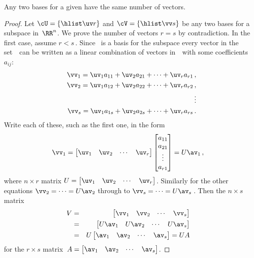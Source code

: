 \begin{theorem} \label{thm:sameDii} 
Any two bases for a given  have the same number of vectors.
\end{theorem}
\begin{proof} 
Let \(\cU=\{\hlist\uv r\}\) and \(\cV=\{\hlist\vv s\}\) be any two  bases for a subspace in~\(\RR^n\).
We prove the number of vectors \(r=s\) by contradiction.
In the first case, assume \(r<s\)\,.
Since \cU\ is a basis for the subspace every vector in the set~\cV\ can be written as a linear combination of vectors in~\cU\ with some coefficients~\(a_{ij}\):
\begin{eqnarray*}
  &&\vv_1=\uv_1a_{11}+\uv_2a_{21}+\cdots+\uv_ra_{r1}\,,
\\&&\vv_2=\uv_1a_{12}+\uv_2a_{22}+\cdots+\uv_ra_{r2}\,,
\\&&\quad\vdots
\\&&\vv_s=\uv_1a_{1s}+\uv_2a_{2s}+\cdots+\uv_ra_{rs}\,.
\end{eqnarray*}
Write each of these, such as the first one, in the form
\begin{equation*}
\vv_1=\begin{bmatrix} \uv_1&\uv_2&\cdots&\uv_r \end{bmatrix}
\begin{bmatrix} a_{11}\\a_{21}\\\vdots\\a_{r1} \end{bmatrix}
=U\av_1\,,
\end{equation*}
where \(n\times r\) matrix \(U=\begin{bmatrix} \uv_1&\uv_2&\cdots&\uv_r \end{bmatrix}\).
Similarly for the other equations \(\vv_2=\cdots=U\av_2\) through to \(\vv_s=\cdots=U\av_s\)\,.
Then the \(n\times s\) matrix
\begin{eqnarray*}
V&=&\begin{bmatrix} \vv_1&\vv_2&\cdots&\vv_s \end{bmatrix}
\\&=&\begin{bmatrix} U\av_1& U\av_2&\cdots&U\av_s\end{bmatrix}
\\&=&U\begin{bmatrix} \av_1& \av_2&\cdots&\av_s\end{bmatrix}
=UA
\end{eqnarray*}
for the \(r\times s\) matrix~\(A=\begin{bmatrix} \av_1& \av_2&\cdots&\av_s \end{bmatrix}\).

\end{proof}
